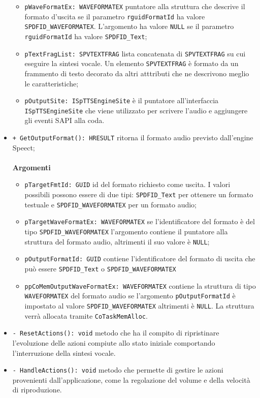 \begin{itemize}
\begin{itemize}
		\item \texttt{pWaveFormatEx: WAVEFORMATEX} puntatore alla struttura che descrive il formato d'uscita se il parametro \texttt{rguidFormatId} ha valore \texttt{SPDFID\_WAVEFORMATEX}. L'argomento ha valore \texttt{NULL} se il parametro \texttt{rguidFormatId} ha valore \texttt{SPDFID\_Text};
		\item \texttt{pTextFragList: SPVTEXTFRAG} lista concatenata di \texttt{SPVTEXTFRAG} su cui eseguire la sintesi vocale. Un elemento \texttt{SPVTEXTFRAG} è formato da un frammento di testo decorato da altri atttributi che ne descrivono meglio le caratteristiche;
		\item \texttt{pOutputSite: ISpTTSEngineSite} è il puntatore all'interfaccia \texttt{ISpTTSEngineSite} che viene utilizzato per scrivere l'audio e aggiungere gli eventi SAPI alla coda.
	\end{itemize}
	\item \texttt{+ GetOutputFormat(): HRESULT} ritorna il formato audio previsto dall'engine Speect;
	\\\\
	\textbf{Argomenti}
	\begin{itemize}
		\item \texttt{pTargetFmtId: GUID} id del formato richiesto come uscita. I valori possibili possono essere di due tipi: \texttt{SPDFID\_Text} per ottenere un formato testuale e \texttt{SPDFID\_WAVEFORMATEX} per un formato audio;
		\item \texttt{pTargetWaveFormatEx: WAVEFORMATEX} se l'identificatore del formato è del tipo \texttt{SPDFID\_WAVEFORMATEX} l'argomento contiene il puntatore alla struttura del formato audio, altrimenti il suo valore è \texttt{NULL};
		\item \texttt{pOutputFormatId: GUID} contiene l'identificatore del formato di uscita che può essere \texttt{SPDFID\_Text} o \texttt{SPDFID\_WAVEFORMATEX}
		\item \texttt{ppCoMemOutputWaveFormatEx: WAVEFORMATEX} contiene la struttura di tipo \texttt{WAVEFORMATEX} del formato audio se l'argomento \texttt{pOutputFormatId} è impostato al valore \texttt{SPDFID\_WAVEFORMATEX} altrimenti è \texttt{NULL}. La struttura verrà allocata tramite \texttt{CoTaskMemAlloc}.
	\end{itemize}
	\item \texttt{- ResetActions(): void} metodo che ha il compito di ripristinare l'evoluzione delle azioni compiute allo stato iniziale comportando l'interruzione della sintesi vocale.
	\item \texttt{- HandleActions(): void} metodo che permette di gestire le azioni provenienti dall'applicazione, come la regolazione del volume e della velocità di riproduzione.

\end{itemize}
